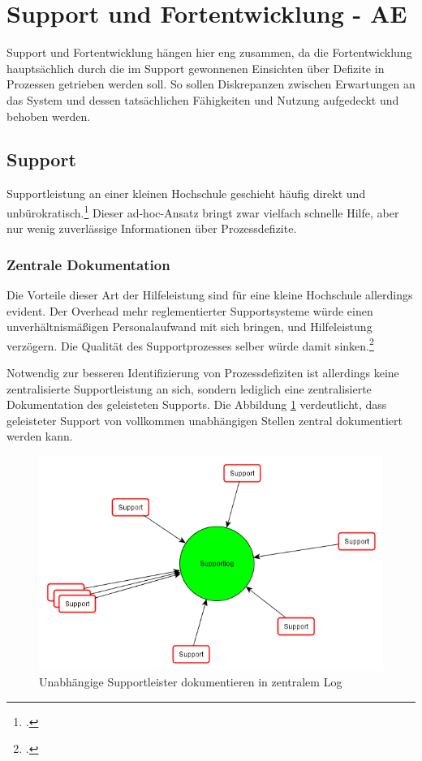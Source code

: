 \section{Support und Fortentwicklung - AE}
Support und Fortentwicklung hängen hier eng zusammen, da die Fortentwicklung 
hauptsächlich durch die im Support gewonnenen Einsichten über Defizite in Prozessen 
getrieben werden soll. So sollen Diskrepanzen zwischen Erwartungen an das System und 
dessen tatsächlichen Fähigkeiten und Nutzung aufgedeckt und behoben werden.

\subsection{Support}
Supportleistung an einer kleinen Hochschule geschieht häufig direkt und 
unbürokratisch.\footcite{gunter_muller_interview} Dieser ad-hoc-Ansatz bringt 
zwar vielfach schnelle Hilfe, aber nur wenig zuverlässige Informationen über Prozessdefizite.

\subsubsection{Zentrale Dokumentation}
Die Vorteile dieser Art der Hilfeleistung sind für eine kleine Hochschule allerdings evident. 
Der Overhead mehr reglementierter Supportsysteme würde einen unverhältnismäßigen 
Personalaufwand mit sich bringen, und Hilfeleistung verzögern. Die Qualität des 
Supportprozesses selber würde damit sinken.\footcite{gunter_muller_interview}

Notwendig zur besseren Identifizierung von Prozessdefiziten ist allerdings keine 
zentralisierte Supportleistung an sich, sondern lediglich eine zentralisierte Dokumentation 
des geleisteten Supports. Die Abbildung \ref{fig_zentraler_supportlog} verdeutlicht, dass geleisteter Support von 
vollkommen unabhängigen Stellen zentral dokumentiert werden kann.

\begin{figure}[h!]
	\centering
	\includegraphics[width=\textwidth]{kapitel/gruppe3/bilder/grafik_supportlog}
	\caption{Unabhängige Supportleister dokumentieren in zentralem Log}
	\label{fig_zentraler_supportlog}
\end{figure}

